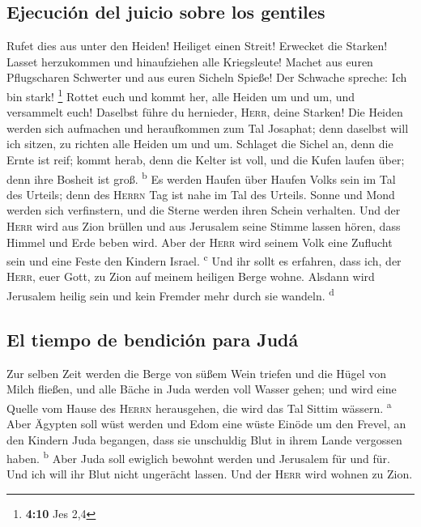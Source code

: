\hypertarget{ejecuciuxf3n-del-juicio-sobre-los-gentiles}{%
\subsection{Ejecución del juicio sobre los
gentiles}\label{ejecuciuxf3n-del-juicio-sobre-los-gentiles}}

 Rufet dies aus unter den Heiden! Heiliget einen Streit!
Erwecket die Starken! Lasset herzukommen und hinaufziehen alle
Kriegsleute!  Machet aus euren Pflugscharen Schwerter und
aus euren Sicheln Spieße! Der Schwache spreche: Ich bin stark!
\footnote{\textbf{4:10} Jes 2,4}  Rottet euch und kommt
her, alle Heiden um und um, und versammelt euch! Daselbst führe du
hernieder, \textsc{Herr}, deine Starken!  Die Heiden
werden sich aufmachen und heraufkommen zum Tal Josaphat; denn daselbst
will ich sitzen, zu richten alle Heiden um und um. 
Schlaget die Sichel an, denn die Ernte ist reif; kommt herab, denn die
Kelter ist voll, und die Kufen laufen über; denn ihre Bosheit ist groß.
\textsuperscript{b}  Es werden Haufen über Haufen Volks
sein im Tal des Urteils; denn des \textsc{Herrn} Tag ist nahe im Tal des
Urteils.  Sonne und Mond werden sich verfinstern, und die
Sterne werden ihren Schein verhalten.  Und der
\textsc{Herr} wird aus Zion brüllen und aus Jerusalem seine Stimme
lassen hören, dass Himmel und Erde beben wird. Aber der \textsc{Herr}
wird seinem Volk eine Zuflucht sein und eine Feste den Kindern Israel.
\textsuperscript{c}  Und ihr sollt es erfahren, dass ich,
der \textsc{Herr}, euer Gott, zu Zion auf meinem heiligen Berge wohne.
Alsdann wird Jerusalem heilig sein und kein Fremder mehr durch sie
wandeln. \textsuperscript{d}

\hypertarget{el-tiempo-de-bendiciuxf3n-para-juduxe1}{%
\subsection{El tiempo de bendición para
Judá}\label{el-tiempo-de-bendiciuxf3n-para-juduxe1}}

 Zur selben Zeit werden die Berge von süßem Wein triefen
und die Hügel von Milch fließen, und alle Bäche in Juda werden voll
Wasser gehen; und wird eine Quelle vom Hause des \textsc{Herrn}
herausgehen, die wird das Tal Sittim wässern. \textsuperscript{a}
 Aber Ägypten soll wüst werden und Edom eine wüste Einöde
um den Frevel, an den Kindern Juda begangen, dass sie unschuldig Blut in
ihrem Lande vergossen haben. \textsuperscript{b}  Aber
Juda soll ewiglich bewohnt werden und Jerusalem für und für.
 Und ich will ihr Blut nicht ungerächt lassen. Und der
\textsc{Herr} wird wohnen zu Zion.
